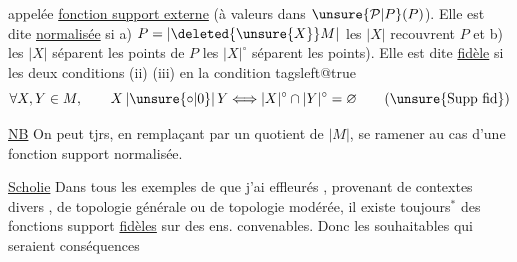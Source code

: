 
appelée \uline{fonction support externe} (à valeurs dans $\unsure{\mathcal P|P}(P)$). Elle est dite \uline{normalisée} si a) $P=|\deleted{\unsure{X}}M|$  les $|X|$ recouvrent $P$ et b) les $|X|$ séparent les points de $P$  \inserted{($\Longleftrightarrow$} les $|X|^\circ$  séparent les points). Elle est dite \uline{fidèle} si les  deux conditions (ii) (iii)  en la condition
\begingroup\csname tagsleft@true\endcsname
\[
 \forall X,Y\in M,\qquad X\,|\unsure{\circ|0}|\,Y
 \Longleftrightarrow |X|^\circ\cap|Y|^\circ=\varnothing \tag*{(\unsure{Supp fid})}
\]
\endgroup

\uline{NB} On peut tjrs, en remplaçant   par un quotient de $|M|$, se ramener au cas d'une fonction support normalisée.

\uline{Scholie} Dans tous les exemples de  que j'ai effleurés , provenant de contextes divers , de topologie générale ou de topologie modérée, il existe toujours$^{*}$
des fonctions support \uline{fidèles} sur des ens. convenables. Donc les   souhaitables qui seraient conséquences
